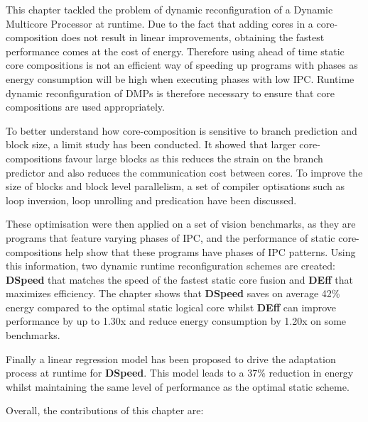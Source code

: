 This chapter tackled the problem of dynamic reconfiguration of a Dynamic Multicore Processor at runtime.
Due to the fact that adding cores in a core-composition does not result in linear improvements, obtaining the fastest performance comes at the cost of energy.
Therefore using ahead of time static core compositions is not an efficient way of speeding up programs with phases as energy consumption will be high when executing phases with low IPC. %
Runtime dynamic reconfiguration of DMPs is therefore necessary to ensure that core compositions are used appropriately.

To better understand how core-composition is sensitive to branch prediction and block size, a limit study has been conducted.
It showed that larger core-compositions favour large blocks as this reduces the strain on the branch predictor and also reduces the communication cost between cores.
To improve the size of blocks and block level parallelism, a set of compiler optisations such as loop inversion, loop unrolling and predication have been discussed.

These optimisation were then applied on a set of vision benchmarks, as they are programs that feature varying phases of IPC, and the performance of static core-compositions help show that these programs have phases of IPC patterns.
Using this information, two dynamic runtime reconfiguration schemes are created:  \textbf{DSpeed} that matches the speed of the fastest static core fusion and \textbf{DEff} that maximizes efficiency.
The chapter shows that \textbf{DSpeed} saves on average 42\% energy compared to the optimal static logical core whilst \textbf{DEff} can improve performance by up to 1.30x and reduce energy consumption by 1.20x on some benchmarks.

Finally a linear regression model has been proposed to drive the adaptation process at runtime for \textbf{DSpeed}.
This  model leads to a 37\% reduction in energy whilst maintaining the same level of performance as the optimal static scheme.

Overall, the contributions of this chapter are:

